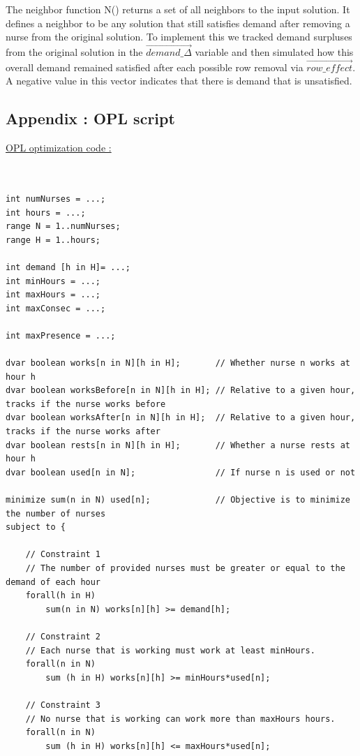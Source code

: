 \documentclass[11pt]{article}
\begin{document}
The neighbor function N() returns a set of all neighbors to the input solution. 
It defines a neighbor to be any solution that still satisfies demand after removing a nurse from the original solution.
To implement this we tracked demand surpluses from the original solution in the $\vec{demand\_\Delta}$ variable and then
simulated how this overall demand remained satisfied after each possible row removal via $\vec{row\_effect}$. A
negative value in this vector indicates that there is demand that is unsatisfied.


\pagebreak
\begin{appendix}

\section{Appendix  : OPL script }
\label{appenOPL}
\underline{OPL optimization code :}\\\\

\tiny{\begin{lstlisting}

int numNurses = ...;
int hours = ...;
range N = 1..numNurses;
range H = 1..hours;

int demand [h in H]= ...;
int minHours = ...;
int maxHours = ...;
int maxConsec = ...;

int maxPresence = ...;

dvar boolean works[n in N][h in H]; 	  // Whether nurse n works at hour h
dvar boolean worksBefore[n in N][h in H]; // Relative to a given hour, tracks if the nurse works before
dvar boolean worksAfter[n in N][h in H];  // Relative to a given hour, tracks if the nurse works after
dvar boolean rests[n in N][h in H]; 	  // Whether a nurse rests at hour h
dvar boolean used[n in N];				  // If nurse n is used or not

minimize sum(n in N) used[n]; 			  // Objective is to minimize the number of nurses 
subject to {

	// Constraint 1
	// The number of provided nurses must be greater or equal to the demand of each hour
	forall(h in H)
		sum(n in N) works[n][h] >= demand[h]; 

	// Constraint 2
	// Each nurse that is working must work at least minHours.
	forall(n in N)
		sum (h in H) works[n][h] >= minHours*used[n];

	// Constraint 3
	// No nurse that is working can work more than maxHours hours.
	forall(n in N)
		sum (h in H) works[n][h] <= maxHours*used[n];


\end{lstlisting}}
\end{appendix}
\end{document}
